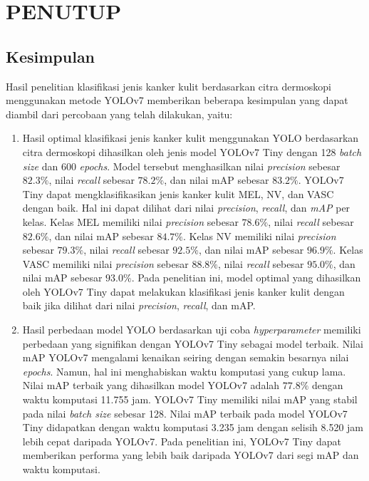 
\chapter{PENUTUP}

\section{Kesimpulan}

Hasil penelitian klasifikasi jenis kanker kulit berdasarkan citra dermoskopi menggunakan metode YOLOv7 memberikan beberapa kesimpulan yang dapat diambil dari percobaan yang telah dilakukan, yaitu:

\begin{enumerate}
    \item Hasil optimal klasifikasi jenis kanker kulit menggunakan YOLO berdasarkan citra dermoskopi dihasilkan oleh jenis model YOLOv7 Tiny dengan 128 \textit{batch size} dan 600 \textit{epochs}. Model tersebut menghasilkan nilai \textit{precision} sebesar $82.3\%$, nilai \textit{recall} sebesar $78.2\%$, dan nilai mAP sebesar $83.2\%$. YOLOv7 Tiny dapat mengklasifikasikan jenis kanker kulit MEL, NV, dan VASC dengan baik. Hal ini dapat dilihat dari nilai \textit{precision}, \textit{recall}, dan \textit{mAP} per kelas. Kelas MEL memiliki nilai \textit{precision} sebesar $78.6\%$, nilai \textit{recall} sebesar $82.6\%$, dan nilai mAP sebesar $84.7\%$. Kelas NV memiliki nilai \textit{precision} sebesar $79.3\%$, nilai \textit{recall} sebesar $92.5\%$, dan nilai mAP sebesar $96.9\%$. Kelas VASC memiliki nilai \textit{precision} sebesar $88.8\%$, nilai \textit{recall} sebesar $95.0\%$, dan nilai mAP sebesar $93.0\%$. Pada penelitian ini, model optimal yang dihasilkan oleh YOLOv7 Tiny dapat melakukan klasifikasi jenis kanker kulit dengan baik jika dilihat dari nilai \textit{precision}, \textit{recall}, dan mAP.
    \item Hasil perbedaan model YOLO berdasarkan uji coba \textit{hyperparameter} memiliki perbedaan yang signifikan dengan YOLOv7 Tiny sebagai model terbaik. Nilai mAP YOLOv7 mengalami kenaikan seiring dengan semakin besarnya nilai \textit{epochs}. Namun, hal ini menghabiskan waktu komputasi yang cukup lama. Nilai mAP terbaik yang dihasilkan model YOLOv7 adalah $77.8\%$ dengan waktu komputasi 11.755 jam. YOLOv7 Tiny memiliki nilai mAP yang stabil pada nilai \textit{batch size} sebesar 128. Nilai mAP terbaik pada model YOLOv7 Tiny didapatkan dengan waktu komputasi 3.235 jam dengan selisih 8.520 jam lebih cepat daripada YOLOv7. Pada penelitian ini, YOLOv7 Tiny dapat memberikan performa yang lebih baik daripada YOLOv7 dari segi mAP dan waktu komputasi.
\end{enumerate}

